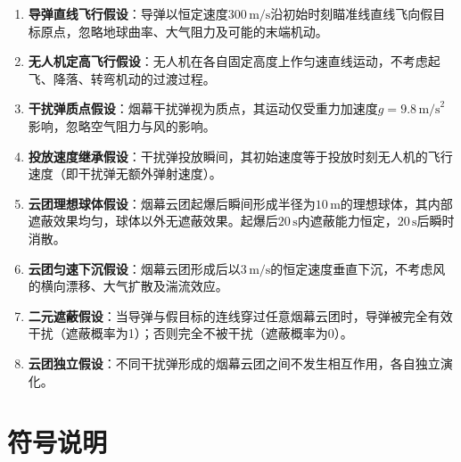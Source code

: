 \documentclass[12pt,a4paper]{ctexart}
\begin{document}
\begin{enumerate}
    \item \textbf{导弹直线飞行假设}：导弹以恒定速度$300\,\text{m/s}$沿初始时刻瞄准线直线飞向假目标原点，忽略地球曲率、大气阻力及可能的末端机动。
    \item \textbf{无人机定高飞行假设}：无人机在各自固定高度上作匀速直线运动，不考虑起飞、降落、转弯机动的过渡过程。
    \item \textbf{干扰弹质点假设}：烟幕干扰弹视为质点，其运动仅受重力加速度$g=9.8\,\text{m/s}^2$影响，忽略空气阻力与风的影响。
    \item \textbf{投放速度继承假设}：干扰弹投放瞬间，其初始速度等于投放时刻无人机的飞行速度（即干扰弹无额外弹射速度）。
    \item \textbf{云团理想球体假设}：烟幕云团起爆后瞬间形成半径为$10\,\text{m}$的理想球体，其内部遮蔽效果均匀，球体以外无遮蔽效果。起爆后$20\,\text{s}$内遮蔽能力恒定，$20\,\text{s}$后瞬时消散。
    \item \textbf{云团匀速下沉假设}：烟幕云团形成后以$3\,\text{m/s}$的恒定速度垂直下沉，不考虑风的横向漂移、大气扩散及湍流效应。
    \item \textbf{二元遮蔽假设}：当导弹与假目标的连线穿过任意烟幕云团时，导弹被完全有效干扰（遮蔽概率为1）；否则完全不被干扰（遮蔽概率为0）。
    \item \textbf{云团独立假设}：不同干扰弹形成的烟幕云团之间不发生相互作用，各自独立演化。
\end{enumerate}

\section{符号说明}
\end{document}
